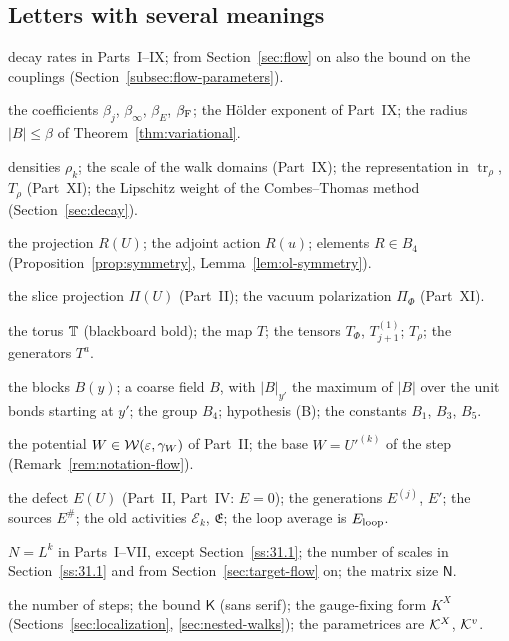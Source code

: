 \subsection*{Letters with several meanings}

{\small
\begin{description}[font=\normalfont,style=nextline,leftmargin=10em,labelwidth=9.5em,labelsep=0.5em,itemsep=1pt,parsep=0pt,topsep=4pt]
\item[$\gamma$] decay rates in Parts~I--IX; from Section~\ref{sec:flow} on also the bound on the couplings (Section~\ref{subsec:flow-parameters}).
\item[$\beta$] the coefficients $\beta_j$, $\beta_\infty$, $\beta_E$, $\beta_{\rm F}$; the H\"older exponent of Part~IX; the radius $|B|\le\beta$ of Theorem~\ref{thm:variational}.
\item[$\rho$] densities $\rho_k$; the scale of the walk domains (Part~IX); the representation in $\operatorname{tr}_\rho$, $T_\rho$ (Part~XI); the Lipschitz weight of the Combes--Thomas method (Section~\ref{sec:decay}).
\item[$R$] the projection $R(U)$; the adjoint action $R(u)$; elements $R\in B_4$ (Proposition~\ref{prop:symmetry}, Lemma~\ref{lem:ol-symmetry}).
\item[$\Pi$] the slice projection $\Pi(U)$ (Part~II); the vacuum polarization $\Pi_\Phi$ (Part~XI).
\item[$T$] the torus $\mathbb T$ (blackboard bold); the map $T$; the tensors $T_\Phi$, $T^{(1)}_{j+1}$; $T_\rho$; the generators $T^a$.
\item[$B$] the blocks $B(y)$; a coarse field $B$, with $|B|_{y'}$ the maximum of $|B|$ over the unit bonds starting at $y'$; the group $B_4$; hypothesis (B); the constants $B_1$, $B_3$, $B_5$.
\item[$W$] the potential $W\in\mathcal W(\varepsilon,\gamma_W)$ of Part~II; the base $W=U'^{(k)}$ of the step (Remark~\ref{rem:notation-flow}).
\item[$E$] the defect $E(U)$ (Part~II, Part~IV: $E=0$); the generations $E^{(j)}$, $E'$; the sources $E^\#$; the old activities $\mathcal E_k$, $\mathfrak E$; the loop average is $E_{\rm loop}$.
\item[$N$] $N=L^k$ in Parts~I--VII, except Section~\ref{ss:31.1}; the number of scales in Section~\ref{ss:31.1} and from Section~\ref{sec:target-flow} on; the matrix size $\mathsf N$.
\item[$K$] the number of steps; the bound $\mathsf K$ (sans serif); the gauge-fixing form $K^X$ (Sections~\ref{sec:localization}, \ref{sec:nested-walks}); the parametrices are $\mathcal K^X$, $\mathcal K^v$.

\end{description}}
